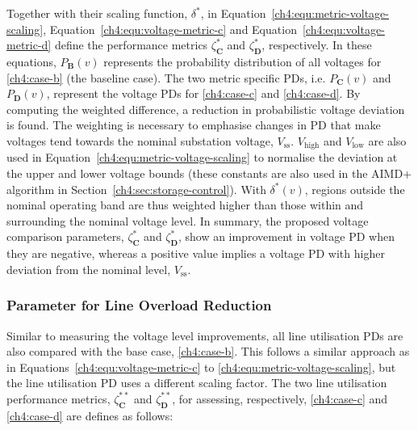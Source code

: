 



Together with their scaling function, $\delta^{*}$, in Equation~\ref{ch4:equ:metric-voltage-scaling}, Equation~\ref{ch4:equ:voltage-metric-c} and Equation~\ref{ch4:equ:voltage-metric-d} define the performance metrics $\zeta_\textbf{C}^{*}$ and $\zeta_\textbf{D}^{*}$, respectively.
In these equations, $P_\textbf{B}(v)$ represents the probability distribution of all voltages for \ref{ch4:case-b} (the baseline case).
The two metric specific PDs, i.e. $P_\textbf{C}(v)$ and $P_\textbf{D}(v)$, represent the voltage PDs for \ref{ch4:case-c} and \ref{ch4:case-d}.
By computing the weighted difference, a reduction in probabilistic voltage deviation is found.
The weighting is necessary to emphasise changes in PD that make voltages tend towards the nominal substation voltage, $V_\text{ss}$.
$V_\text{high}$ and $V_\text{low}$ are also used in Equation~\ref{ch4:equ:metric-voltage-scaling} to normalise the deviation at the upper and lower voltage bounds (these constants are also used in the AIMD+ algorithm in Section~\ref{ch4:sec:storage-control}).
With $\delta^{*}(v)$, regions outside the nominal operating band are thus weighted higher than those within and surrounding the nominal voltage level.
In summary, the proposed voltage comparison parameters, $\zeta^*_\textbf{C}$ and $\zeta^*_\textbf{D}$, show an improvement in voltage PD when they are negative, whereas a positive value implies a voltage PD with higher deviation from the nominal level, $V_\text{ss}$.

\subsubsection{Parameter for Line Overload Reduction}

Similar to measuring the voltage level improvements, all line utilisation PDs are also compared with the base case, \ref{ch4:case-b}.
This follows a similar approach as in Equations~\ref{ch4:equ:voltage-metric-c} to \ref{ch4:equ:metric-voltage-scaling}, but the line utilisation PD uses a different scaling factor.
The two line utilisation performance metrics, $\zeta_\textbf{C}^{**}$ and $\zeta_\textbf{D}^{**}$, for assessing, respectively, \ref{ch4:case-c} and   \ref{ch4:case-d} are defines as follows:

